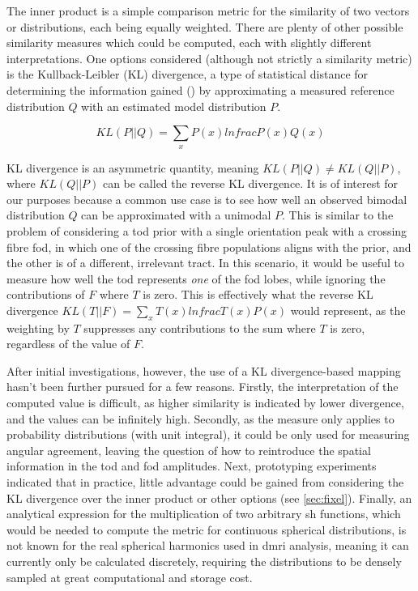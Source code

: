 The inner product is a simple comparison metric for the similarity of two vectors or distributions, each being equally weighted.
There are plenty of other possible similarity measures which could be computed, each with slightly different interpretations.
One options considered (although not strictly a similarity metric) is the Kullback-Leibler (KL) divergence, a type of statistical distance for determining the information gained () by approximating a measured reference distribution $Q$ with an estimated model distribution $P$.

\begin{equation}
  KL(P||Q) = \sum_x P(x) ln frac{P(x)}{Q(x)} \label{eq:kl}
\end{equation}

KL divergence is an asymmetric quantity, meaning $KL(P||Q) \neq KL(Q||P)$, where $KL(Q||P)$ can be called the reverse KL divergence.
It is of interest for our purposes because a common  use case is to see how well an observed bimodal distribution $Q$ can be approximated with a unimodal $P$.
This is similar to the problem of considering a \gls{tod} prior with a single orientation peak with a crossing fibre \gls{fod}, in which one of the crossing fibre populations aligns with the prior, and the other is of a different, irrelevant tract.
In this scenario, it would be useful to measure how well the \gls{tod} represents \textit{one} of the \gls{fod} lobes, while ignoring the contributions of $F$ where $T$ is zero.
This is effectively what the reverse KL divergence $KL(T||F) = \sum_x T(x) ln frac{T(x)}{P(x)}$ would represent, as the weighting by $T$ suppresses any contributions to the sum where $T$ is zero, regardless of the value of $F$.

After initial investigations, however, the use of a KL divergence-based mapping hasn't been further pursued for a few reasons.
Firstly, the interpretation of the computed value is difficult, as higher similarity is indicated by lower divergence, and the values can be infinitely high.
Secondly, as the measure only applies to probability distributions (with unit integral), it could be only used for measuring angular agreement, leaving the question of how to reintroduce the spatial information in the \gls{tod} and \gls{fod} amplitudes.
Next, prototyping experiments indicated that in practice, little advantage  could be gained from considering the KL  divergence over the inner product or other options (see \ref{sec:fixel}).
Finally, an analytical expression for the multiplication of two arbitrary \gls{sh} functions, which would be needed to compute the metric for continuous spherical distributions, is not known for the real spherical harmonics used in \gls{dmri} analysis, meaning it can currently only be calculated discretely, requiring the distributions to be densely sampled at great computational and storage cost.

